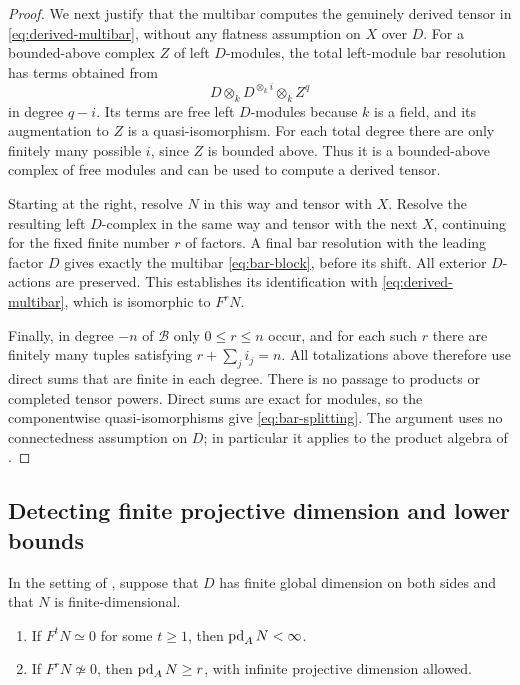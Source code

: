 \begin{proof}
We next justify that the multibar computes the genuinely
derived tensor in \eqref{eq:derived-multibar}, without any
flatness assumption on \(X\) over \(D\).
For a bounded-above complex \(Z\) of left \(D\)-modules,
the total left-module bar resolution has terms obtained
from
\[
D\otimes_k D^{\otimes_k i}\otimes_k Z^q
\]
in degree \(q-i\).  Its terms are free left \(D\)-modules
because \(k\) is a field, and its augmentation to \(Z\)
is a quasi-isomorphism.  For each total degree there are
only finitely many possible \(i\), since \(Z\) is bounded
above.  Thus it is a bounded-above complex of free
modules and can be used to compute a derived tensor.

Starting at the right, resolve \(N\) in this way and
tensor with \(X\).  Resolve the resulting left
\(D\)-complex in the same way and tensor with the next
\(X\), continuing for the fixed finite number \(r\)
of factors.  A final bar resolution with the leading
factor \(D\) gives exactly the multibar
\eqref{eq:bar-block}, before its shift.
All exterior \(D\)-actions are preserved.
This establishes its identification with
\eqref{eq:derived-multibar}, which is isomorphic to
\(F^rN\).

Finally, in degree \(-n\) of \(\mathcal B\) only
\(0\le r\le n\) occur, and for each such \(r\) there
are finitely many tuples satisfying
\(r+\sum_j i_j=n\).
All totalizations above therefore use direct sums that
are finite in each degree.  There is no passage to
products or completed tensor powers.
Direct sums are exact for modules, so the componentwise
quasi-isomorphisms give \eqref{eq:bar-splitting}.
The argument uses no connectedness assumption on \(D\);
in particular it applies to the product algebra of
.
\end{proof}

\subsection{Detecting finite projective dimension and lower bounds}

\begin{corollary}
\label{cor:pd-detection}
In the setting of , suppose that
\(D\) has finite global dimension on both sides and that
\(N\) is finite-dimensional.
\begin{enumerate}
\item If \(F^tN\simeq0\) for some \(t\ge1\), then
      \(\operatorname{pd}_A N<\infty\).
\item If \(F^rN\not\simeq0\), then \(\operatorname{pd}_A N\ge r\),
      with infinite projective dimension allowed.
\end{enumerate}
\end{corollary}

